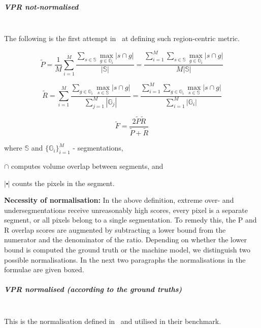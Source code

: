 \subparagraph{VPR not-normalised}\mbox{}\\
The following is the first attempt in~\cite{Galasso13} at defining such region-centric metric.

\begin{equation}
\tilde{P}=\frac{1}{M}\sum\limits _{i=1}^{M}\frac{\sum\limits _{s\in\mathbb{S}}\max\limits _{g\in\mathbb{G}_{i}}\left|s\cap g\right|}{\left|\mathbb{S}\right|}=\frac{\sum\limits _{i=1}^{M}\sum\limits _{s\in\mathbb{S}}\max\limits _{g\in\mathbb{G}_{i}}\left|s\cap g\right|}{M\left|\mathbb{S}\right|}
\end{equation}

\begin{equation}
\tilde{R}=\sum\limits _{i=1}^{M}\frac{\sum\limits _{g\in\mathbb{G}_{i}}\max\limits _{s\in\mathbb{S}}\left|s\cap g\right|}{\sum\limits _{j=1}^{M}\left|\mathbb{G}_{j}\right|}=\frac{\sum\limits _{i=1}^{M}\sum\limits _{g\in\mathbb{G}_{i}}\max\limits _{s\in\mathbb{S}}\left|s\cap g\right|}{\sum\limits _{i=1}^{M}\left|\mathbb{G}_{i}\right|}
\end{equation}


\begin{equation}
\tilde{F}=\frac{2\tilde{P}\tilde{R}}{\tilde{P}+\tilde{R}}
\end{equation}

where $\mathbb{S}$ and $\{\mathbb{G}_{i}\}_{i=1}^{M}$ - segmentations,

$\cap$ computes volume overlap between segments, and 

$\left|\centerdot\right|$ counts the pixels in the segment.%

\textbf{Necessity of normalisation:} In the above definition, extreme over- and undersegmentations receive unreasonably high scores, \ie every pixel is a separate segment, or all pixels belong to a single segmentation. To remedy this, the P and R overlap scores are augmented by subtracting a lower bound from the numerator and the denominator of the ratio. Depending on whether the lower bound is computed \wrt the ground truth or the machine model, we distinguish two possible normalisations. In the next two paragraphs the normalisations in the formulae are given boxed.

\subparagraph{VPR normalised (according to the ground truths)}\mbox{}\\ %
This is the normalisation defined in~\cite{Galasso13} and utilised %
in their benchmark.

